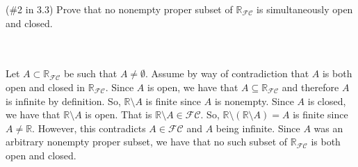 (\#2 in 3.3) Prove that no nonempty proper subset of $\mathbb{R}_{\mathcal{FC}}$ is simultaneously open
and closed.\\\\

\begin{solution}\renewcommand{\qedsymbol}{}\ \\
    Let $A\subset\mathbb{R}_{\mathcal{FC}}$ be such that $A\neq\emptyset$. Assume by way of
    contradiction that $A$ is both open and closed in $\mathbb{R}_{\mathcal{FC}}$. Since $A$ is open, we
    have that $A\subseteq\mathbb{R}_{\mathcal{FC}}$ and therefore $A$ is infinite by definition. So,
    $\mathbb{R}\setminus A$ is finite since $A$ is nonempty. Since $A$ is closed, we have that
    $\mathbb{R}\setminus A$ is open. That is $\mathbb{R}\setminus A\in\mathcal{FC}$. So,
    $\mathbb{R}\setminus(\mathbb{R}\setminus A)=A$ is finite since $A\neq\mathbb{R}$. However, this
    contradicts $A\in\mathcal{FC}$ and $A$ being infinite. Since $A$ was an arbitrary nonempty proper
    subset, we have that no such subset of $\mathbb{R}_{\mathcal{FC}}$ is both open and closed.

\end{solution}